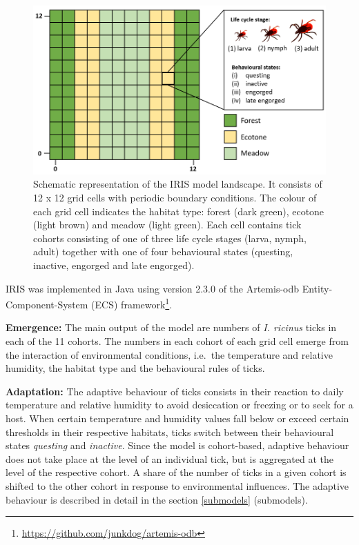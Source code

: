 \documentclass[a4paper, 11pt]{scrartcl}
\begin{document}
\begin{figure}[h!]
\centering
\includegraphics[width=0.75\linewidth]{figures/iris_landscape.png}
\caption[Schematic representation of the IRIS model landscape.]{Schematic representation of the IRIS model landscape. It consists of 12 x 12 grid cells with periodic boundary conditions. The colour of each grid cell indicates the habitat type: forest (dark green), ecotone (light brown) and meadow (light green). Each cell contains tick cohorts consisting of one of three life cycle stages (larva, nymph, adult) together with one of four behavioural states (questing, inactive, engorged and late engorged).}
\label{fig:iris_landscape}
\end{figure}

IRIS was implemented in Java using version 2.3.0 of the Artemis-odb Entity-Component-System (ECS) framework\footnote{\url{https://github.com/junkdog/artemis-odb}}.


\textbf{Emergence:} The main output of the model are numbers of \emph{I. ricinus} ticks in each of the 11 cohorts. The numbers in each cohort of each grid cell emerge from the interaction of environmental conditions, i.e.\ the temperature and relative humidity, the habitat type and the behavioural rules of ticks.

\textbf{Adaptation:} The adaptive behaviour of ticks consists in their reaction to daily temperature and relative humidity to avoid desiccation or freezing or to seek for a host. When certain temperature and humidity values fall below or exceed certain thresholds in their respective habitats, ticks switch between their behavioural states \emph{questing} and \emph{inactive}. Since the model is cohort-based, adaptive behaviour does not take place at the level of an individual tick, but is aggregated at the level of the respective cohort. A share of the number of ticks in a given cohort is shifted to the other cohort in response to environmental influences. The adaptive behaviour is described in detail in the section \ref{submodels} (submodels).
\end{document}
